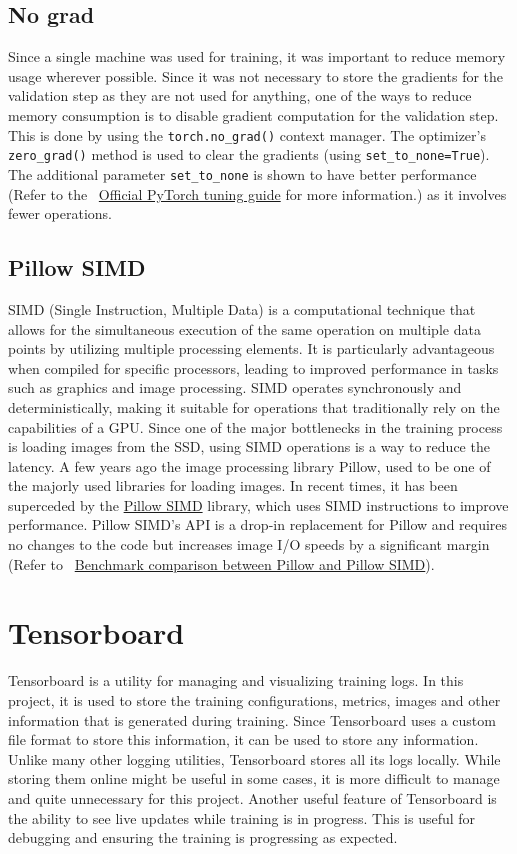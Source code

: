 \subsection{No grad}
Since a single machine was used for training, it was important to reduce memory usage wherever possible. Since it was not necessary to store the gradients for the validation step as they are not used for anything, one of the ways to reduce memory consumption is to disable gradient computation for the validation step. This is done by using the \texttt{torch.no\_grad()} context manager.  The optimizer's \texttt{zero\_grad()} method is used to clear the gradients (using \texttt{set\_to\_none=True}). The additional parameter \texttt{set\_to\_none} is shown to have better performance (Refer to the ~\href{https://pytorch.org/tutorials/recipes/recipes/tuning_guide.html}{Official PyTorch tuning guide} for more information.) as it involves fewer operations.

\subsection{Pillow SIMD}
SIMD (Single Instruction, Multiple Data) is a computational technique that allows for the simultaneous execution of the same operation on multiple data points by utilizing multiple processing elements. It is particularly advantageous when compiled for specific processors, leading to improved performance in tasks such as graphics and image processing. SIMD operates synchronously and deterministically, making it suitable for operations that traditionally rely on the capabilities of a GPU. Since one of the major bottlenecks in the training process is loading images from the SSD, using SIMD operations is a way to reduce the latency. A few years ago the image processing library Pillow, used to be one of the majorly used libraries for loading images. In recent times, it has been superceded by the \href{https://github.com/uploadcare/pillow-simd}{Pillow SIMD} library, which uses SIMD instructions to improve performance. Pillow SIMD's API is a drop-in replacement for Pillow and requires no changes to the code but increases image I/O speeds by a significant margin (Refer to ~\href{https://python-pillow.org/pillow-perf/}{Benchmark comparison between Pillow and Pillow SIMD}).


\section{Tensorboard}
Tensorboard is a utility for managing and visualizing training logs. In this project, it is used to store the training configurations, metrics, images and other information that is generated during training. Since Tensorboard uses a custom file format to store this information, it can be used to store any information. Unlike many other logging utilities, Tensorboard stores all its logs locally. While storing them online might be useful in some cases, it is more difficult to manage and quite unnecessary for this project.
Another useful feature of Tensorboard is the ability to see live updates while training is in progress. This is useful for debugging and ensuring the training is progressing as expected.

